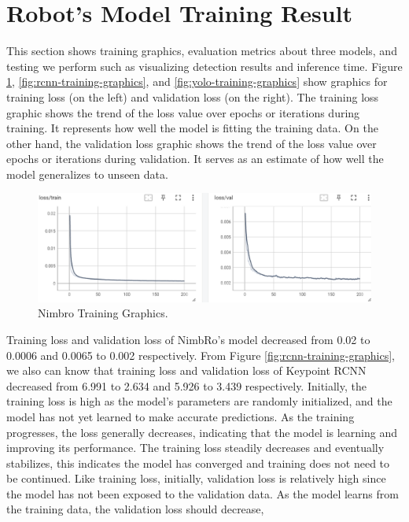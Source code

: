 \section{Robot's Model Training Result}
\label{sec:robotmodeltrainingresult}

This section shows training graphics, evaluation metrics about three models, and testing we perform such as visualizing detection results and inference time.
Figure \ref{fig:nimbro-training-graphics}, \ref{fig:rcnn-training-graphics}, and \ref{fig:yolo-training-graphics} show graphics for training loss (on the left) and validation loss (on the right).
The training loss graphic shows the trend of the loss value over epochs or iterations during training. It represents how well the model is fitting the training data.
On the other hand, the validation loss graphic shows the trend of the loss value over epochs or iterations during validation.  It serves as an estimate of how well the model generalizes to unseen data.
\begin{figure}[ht]
  \centering
  \includegraphics[scale=0.65]{gambar/loss-nimbro.png}
  \caption{Nimbro Training Graphics.}
  \label{fig:nimbro-training-graphics}
\end{figure}
Training loss and validation loss of NimbRo's model decreased from 0.02 to 0.0006 and 0.0065 to 0.002 respectively. From Figure \ref{fig:rcnn-training-graphics},
we also can know that training loss and validation loss of Keypoint RCNN decreased from 6.991 to 2.634 and 5.926 to 3.439 respectively. Initially, the training loss is high as the model's parameters are randomly initialized,
  and the model has not yet learned to make accurate predictions. As the training progresses, the loss generally decreases, indicating that the model is learning and improving its performance.
The training loss steadily decreases and eventually stabilizes, this indicates the model has converged and training does not need to be continued.
Like training loss, initially, validation loss is relatively high since the model has not been exposed to the validation data. As the model learns from the training data, the validation loss should decrease,
